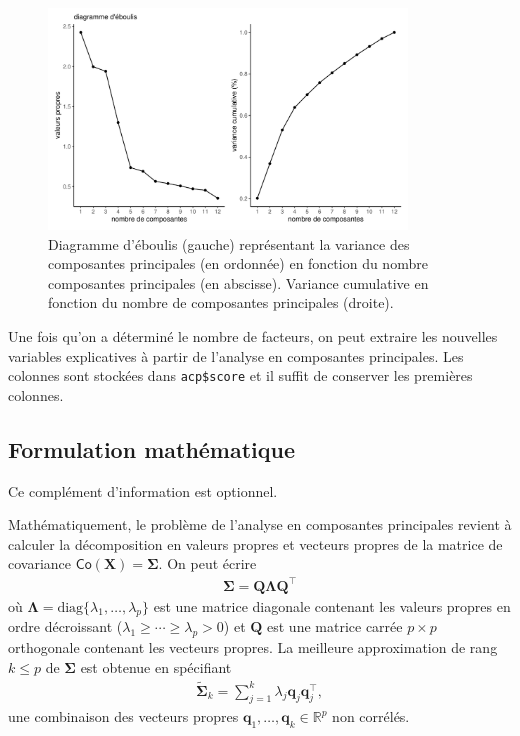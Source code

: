 \documentclass[
  11pt,
  letterpaper,
]{scrbook}
\theoremstyle{definition}
\theoremstyle{remark}
\begin{document}
\begin{figure}[ht!]

{\centering \includegraphics[width=0.85\textwidth,height=\textheight]{analysefactorielle_files/figure-pdf/fig-screeplot-1.pdf}

}

\caption{\label{fig-screeplot}Diagramme d'éboulis (gauche) représentant
la variance des composantes principales (en ordonnée) en fonction du
nombre composantes principales (en abscisse). Variance cumulative en
fonction du nombre de composantes principales (droite).}

\end{figure}

Une fois qu'on a déterminé le nombre de facteurs, on peut extraire les
nouvelles variables explicatives à partir de l'analyse en composantes
principales. Les colonnes sont stockées dans \texttt{acp\$score} et il
suffit de conserver les premières colonnes.

\hypertarget{formulation-mathuxe9matique}{%
\subsection{Formulation
mathématique}\label{formulation-mathuxe9matique}}

Ce complément d'information est optionnel.

Mathématiquement, le problème de l'analyse en composantes principales
revient à calculer la décomposition en valeurs propres et vecteurs
propres de la matrice de covariance
\(\mathsf{Co}(\boldsymbol{X})=\boldsymbol{\Sigma}\). On peut écrire
\begin{align*}
\boldsymbol{\Sigma} = \boldsymbol{Q}\boldsymbol{\Lambda}\boldsymbol{Q}^\top
\end{align*} où
\(\boldsymbol{\Lambda} = \mathrm{diag}\{\lambda_1, \ldots, \lambda_p\}\)
est une matrice diagonale contenant les valeurs propres en ordre
décroissant (\(\lambda_1 \geq \cdots \geq \lambda_p > 0\)) et
\(\boldsymbol{Q}\) est une matrice carrée \(p \times p\) orthogonale
contenant les vecteurs propres. La meilleure approximation de rang
\(k \leq p\) de \(\boldsymbol{\Sigma}\) est obtenue en spécifiant
\begin{align*}
\widetilde{\boldsymbol{\Sigma}}_k = \sum_{j=1}^k \lambda_j \boldsymbol{q}_j\boldsymbol{q}_j^\top,
\end{align*} une combinaison des vecteurs propres
\(\boldsymbol{q}_1, \ldots, \boldsymbol{q}_k \in \mathbb{R}^p\) non
corrélés.
\end{document}
